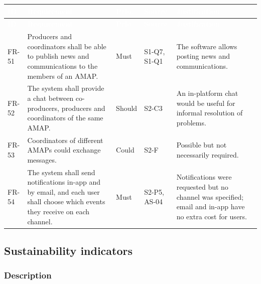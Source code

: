 \documentclass[11pt,a4paper]{article}
\begin{document}
{\footnotesize
\begin{longtable}{>{\raggedright\arraybackslash\hspace{0pt}}p{}>{\raggedright\arraybackslash\hspace{0pt}}p{}>{\raggedright\arraybackslash\hspace{0pt}}p{}>{\raggedright\arraybackslash\hspace{0pt}}p{}>{\raggedright\arraybackslash\hspace{0pt}}p{}}
\rowcolor{hdr}\textcolor{white}{\textbf{ID}} & \textcolor{white}{\textbf{Requirement}} & \textcolor{white}{\textbf{Prio.}} & \textcolor{white}{\textbf{Source}} & \textcolor{white}{\textbf{Justification}} \\ \endfirsthead
\rowcolor{hdr}\textcolor{white}{\textbf{ID}} & \textcolor{white}{\textbf{Requirement}} & \textcolor{white}{\textbf{Prio.}} & \textcolor{white}{\textbf{Source}} & \textcolor{white}{\textbf{Justification}} \\ \endhead
FR-51 & Producers and coordinators shall be able to publish news and communications to the members of an AMAP. & Must & S1-Q7, S1-Q1 & The software allows posting news and communications. \\ \hline
FR-52 & The system shall provide a chat between co-producers, producers and coordinators of the same AMAP. & Should & S2-C3 & An in-platform chat would be useful for informal resolution of problems. \\ \hline
FR-53 & Coordinators of different AMAPs could exchange messages. & Could & S2-F & Possible but not necessarily required. \\ \hline
FR-54 & The system shall send notifications in-app and by email, and each user shall choose which events they receive on each channel. & Must & S2-P5, AS-04 & Notifications were requested but no channel was specified; email and in-app have no extra cost for users. \\ \hline
\end{longtable}}
\addtocounter{table}{-1}

\subsection{Sustainability indicators}


\subsubsection{Description}
\end{document}
